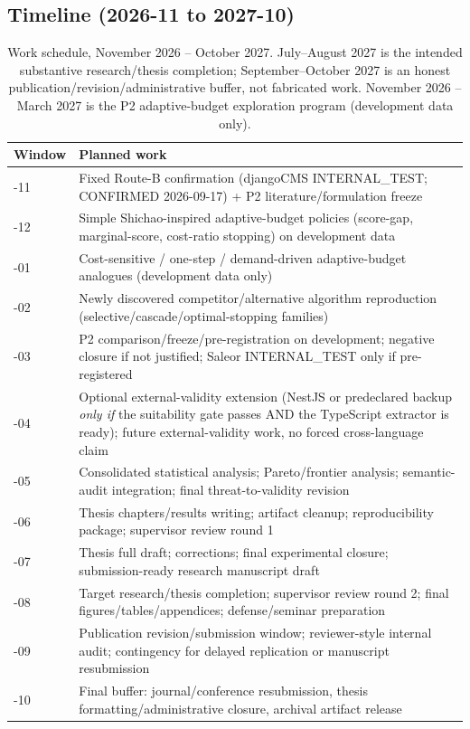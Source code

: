 \documentclass[11pt,a4paper]{article}
\begin{document}
\subsection{Timeline (2026-11 to 2027-10)}
\begin{table}[h]
\centering
\small
\renewcommand{\arraystretch}{1.25}
\setlength{\tabcolsep}{6pt}
\begin{tabularx}{\textwidth}{@{}>{\raggedright\arraybackslash}p{1.9cm}>{\raggedright\arraybackslash}X@{}}
\toprule
\textbf{Window} & \textbf{Planned work} \\
\midrule
2026-11 & Fixed Route-B confirmation (djangoCMS INTERNAL\_TEST; CONFIRMED 2026-09-17) + P2 literature/formulation freeze \\
2026-12 & Simple Shichao-inspired adaptive-budget policies (score-gap, marginal-score, cost-ratio stopping) on development data \\
2027-01 & Cost-sensitive / one-step / demand-driven adaptive-budget analogues (development data only) \\
2027-02 & Newly discovered competitor/alternative algorithm reproduction (selective/cascade/optimal-stopping families) \\
2027-03 & P2 comparison/freeze/pre-registration on development; negative closure if not justified; Saleor INTERNAL\_TEST only if pre-registered \\
2027-04 & Optional external-validity extension (NestJS or predeclared backup \emph{only if} the suitability gate passes AND the TypeScript extractor is ready); future external-validity work, no forced cross-language claim \\
2027-05 & Consolidated statistical analysis; Pareto/frontier analysis; semantic-audit integration; final threat-to-validity revision \\
2027-06 & Thesis chapters/results writing; artifact cleanup; reproducibility package; supervisor review round 1 \\
2027-07 & Thesis full draft; corrections; final experimental closure; submission-ready research manuscript draft \\
2027-08 & Target research/thesis completion; supervisor review round 2; final figures/tables/appendices; defense/seminar preparation \\
2027-09 & Publication revision/submission window; reviewer-style internal audit; contingency for delayed replication or manuscript resubmission \\
2027-10 & Final buffer: journal/conference resubmission, thesis formatting/administrative closure, archival artifact release \\
\bottomrule
\end{tabularx}
\caption{Work schedule, November 2026 -- October 2027. July--August 2027 is the intended substantive research/thesis completion; September--October 2027 is an honest publication/revision/administrative buffer, not fabricated work. November 2026 -- March 2027 is the P2 adaptive-budget exploration program (development data only).}
\end{table}
\end{document}
